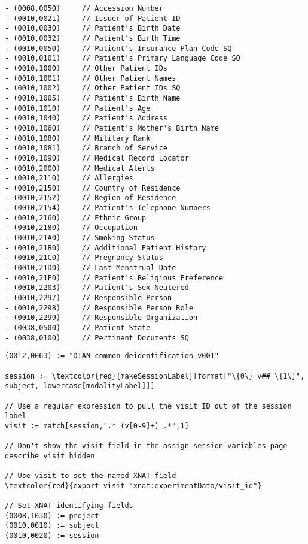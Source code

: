 \documentclass{beamer}  %
\begin{document}
\begin{frame}[fragile]
\tiny
\begin{verbatim}
- (0008,0050)     // Accession Number
- (0010,0021)     // Issuer of Patient ID
- (0010,0030)     // Patient's Birth Date
- (0010,0032)     // Patient's Birth Time
- (0010,0050)     // Patient's Insurance Plan Code SQ
- (0010,0101)     // Patient's Primary Language Code SQ
- (0010,1000)     // Other Patient IDs
- (0010,1001)     // Other Patient Names
- (0010,1002)     // Other Patient IDs SQ
- (0010,1005)     // Patient's Birth Name
- (0010,1010)     // Patient's Age
- (0010,1040)     // Patient's Address
- (0010,1060)     // Patient's Mother's Birth Name
- (0010,1080)     // Military Rank
- (0010,1081)     // Branch of Service
- (0010,1090)     // Medical Record Locator
- (0010,2000)     // Medical Alerts
- (0010,2110)     // Allergies
- (0010,2150)     // Country of Residence
- (0010,2152)     // Region of Residence
- (0010,2154)     // Patient's Telephone Numbers
- (0010,2160)     // Ethnic Group
- (0010,2180)     // Occupation
- (0010,21A0)     // Smoking Status
- (0010,21B0)     // Additional Patient History
- (0010,21C0)     // Pregnancy Status
- (0010,21D0)     // Last Menstrual Date
- (0010,21F0)     // Patient's Religious Preference
- (0010,2203)     // Patient's Sex Neutered
- (0010,2297)     // Responsible Person
- (0010,2298)     // Responsible Person Role
- (0010,2299)     // Responsible Organization
- (0038,0500)     // Patient State
- (0038,0100)     // Pertinent Documents SQ
\end{verbatim}
\end{frame}

\begin{frame}[fragile]
\tiny
\begin{Verbatim}[commandchars=\\\{\}]
(0012,0063) := "DIAN common deidentification v001"

session := \textcolor{red}{makeSessionLabel}[format["\{0\}_v##_\{1\}", subject, lowercase[modalityLabel]]]

// Use a regular expression to pull the visit ID out of the session label
visit := match[session,".*_(v[0-9]+)_.*",1]

// Don't show the visit field in the assign session variables page
describe visit hidden                           

// Use visit to set the named XNAT field
\textcolor{red}{export visit "xnat:experimentData/visit_id"}

// Set XNAT identifying fields
(0008,1030) := project
(0010,0010) := subject
(0010,0020) := session
\end{Verbatim}
\end{frame}
\end{document}
